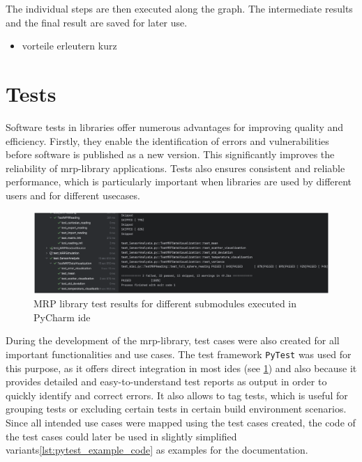 The individual steps are then executed along the graph. The intermediate
results and the final result are saved for later use.

\begin{itemize}
\tightlist
\item
  vorteile erleutern kurz
\end{itemize}

\hypertarget{tests}{%
\section{Tests}\label{tests}}

Software tests in libraries offer numerous advantages for improving
quality and efficiency. Firstly, they enable the identification of
errors and vulnerabilities before software is published as a new
version. This significantly improves the reliability of
\gls{mrp}-library applications. Tests also ensures consistent and
reliable performance, which is particularly important when libraries are
used by different users and for different usecases.

\begin{figure}
\centering
\includegraphics{./generated_images/border_MRP_library_test_results_for_different_submodules_executed_in_PyCharm_(+ide).png}
\caption{MRP library test results for different submodules executed in
PyCharm \gls{ide}
\label{MRP_library_test_results_for_different_submodules_executed_in_PyCharm_(+ide).png}}
\end{figure}

During the development of the \gls{mrp}-library, test cases were also
created for all important functionalities and use cases. The test
framework \passthrough{\lstinline!PyTest!}\cite{PyTest} was used for
this purpose, as it offers direct integration in most \gls{ide}s (see
\ref{MRP_library_test_results_for_different_submodules_executed_in_PyCharm_(+ide).png})
and also because it provides detailed and easy-to-understand test
reports as output in order to quickly identify and correct errors. It
also allows to tag tests, which is useful for grouping tests or
excluding certain tests in certain build environment scenarios. Since
all intended use cases were mapped using the test cases created, the
code of the test cases could later be used in slightly simplified
variants\ref{lst:pytest_example_code} as examples for the documentation.

